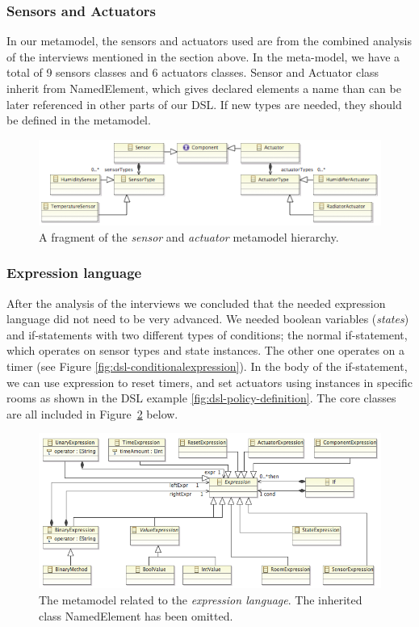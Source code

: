 \subsubsection{Sensors and Actuators}
In our metamodel, the sensors and actuators used are from the combined analysis of the interviews mentioned in the section above. In the meta-model, we have a total of 9 sensors classes and 6 actuators classes. Sensor and Actuator class inherit from NamedElement, which gives declared elements a name than can be later referenced in other parts of our DSL. If new types are needed, they should be defined in the metamodel.

\begin{figure}[h]
	\centering
    \includegraphics[scale=.5]{ecore-sensors-actuators.png} 
	\caption{A fragment of the \textit{sensor} and \textit{actuator} metamodel hierarchy.}
	\label{fig:ecore-sensors-actuators}
\end{figure}


\subsubsection{Expression language}
After the analysis of the interviews we concluded that the needed expression language did not need to be very advanced. We needed boolean variables (\textit{states}) and if-statements with two different types of conditions; the normal if-statement, which operates on sensor types and state instances. The other one operates on a timer (see Figure \ref{fig:dsl-conditionalexpression}). In the body of the if-statement, we can use expression to reset timers, and set actuators using instances in specific rooms as shown in the DSL example \ref{fig:dsl-policy-definition}. The core classes are all included in Figure \ref{fig:ecore-expression-language} below.

\begin{figure}[h]
  \centering
    \includegraphics[scale=.5]{ecore-expression-language.png} 
	\caption{The metamodel related to the \textit{expression language}. The inherited class NamedElement has been omitted.}
	\label{fig:ecore-expression-language}
\end{figure}

